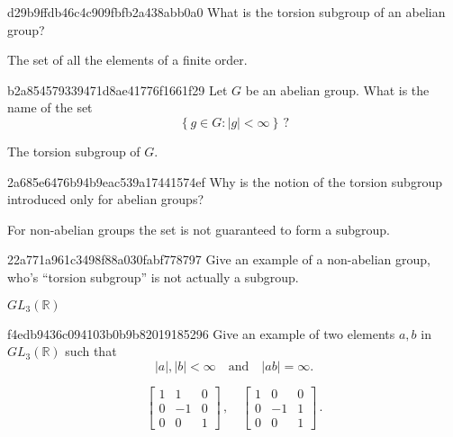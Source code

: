 \begin{note}{d29b9ffdb46c4c909fbfb2a438abb0a0}
    What is the torsion subgroup of an abelian group?

    \begin{cloze}{1}
        The set of all the elements of a finite order.
    \end{cloze}
\end{note}

\begin{note}{b2a854579339471d8ae41776f1661f29}
    Let \({ G }\) be an abelian group. What is the name of the set
    \[
        \left\{ g \in G : \left\lvert g \right\rvert < \infty \right\}\,?
    \]

    \begin{cloze}{1}
        The torsion subgroup of \({ G }\).
    \end{cloze}
\end{note}

\begin{note}{2a685e6476b94b9eac539a17441574ef}
    Why is the notion of the torsion subgroup introduced only for abelian groups?

    \begin{cloze}{1}
        For non-abelian groups the set is not guaranteed to form a subgroup.
    \end{cloze}
\end{note}

\begin{note}{22a771a961c3498f88a030fabf778797}
    Give an example of a non-abelian group, who's ``torsion subgroup'' is not actually a subgroup.

    \begin{cloze}{1}
        \({ GL_3(\mathbb R) }\)
    \end{cloze}
\end{note}

\begin{note}{f4edb9436c094103b0b9b82019185296}
    Give an example of two elements \({ a, b }\) in \({ GL_3(\mathbb R) }\) such that
    \[
        \left\lvert a \right\rvert, \left\lvert b \right\rvert < \infty \quad \text{and} \quad \left\lvert ab \right\rvert = \infty.
    \]

    \begin{cloze}{1}
        \[
            \begin{bmatrix}
                1 & 1  & 0 \\
                0 & -1 & 0 \\
                0 & 0  & 1
            \end{bmatrix}\,,
            \quad
            \begin{bmatrix}
                1 & 0  & 0 \\
                0 & -1 & 1 \\
                0 & 0  & 1
            \end{bmatrix}\,.
        \]
    \end{cloze}
\end{note}

